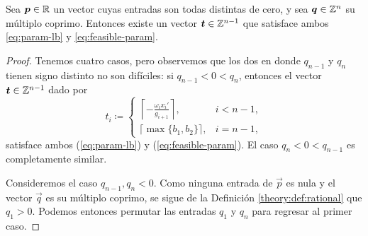 \begin{lemma}
	\label{lemma:t-existence}
	Sea $\boldsymbol{p} \in \mathbb{R}$ un vector cuyas entradas son todas distintas de cero, y sea $\boldsymbol{q} \in
	\mathbb{Z}^n$ su múltiplo coprimo. Entonces existe un vector $\boldsymbol{t} \in \mathbb{Z}^{n-1}$ que satisface ambos
	\eqref{eq:param-lb} y \eqref{eq:feasible-param}.
\end{lemma}
\begin{proof}
	Tenemos cuatro casos, pero observemos que los dos en donde $q_{n - 1}$ y $q_n$
	tienen signo distinto no son difíciles: si $q_{n - 1} <0 < q_n$, entonces el vector
	$\boldsymbol{t} \in \mathbb{Z}^{n-1}$ dado por
	\begin{equation*}
		t_i \coloneq \begin{cases}
			\left\lceil -\frac{\omega_ix_i'}{g_{i + 1}} \right\rceil, & i < n - 1, \\[0.5em]
			\lceil \max\lbrace b_1, b_2 \rbrace \rceil, & i = n - 1,
		\end{cases}
	\end{equation*}
	satisface ambos (\ref{eq:param-lb}) y (\ref{eq:feasible-param}). El caso $q_n < 0 <
	q_{n - 1}$ es completamente similar.

	Consideremos el caso $q_{n - 1}, q_n < 0$. Como ninguna entrada de $\vec{p}$ es nula y el vector
	$\vec{q}$ es su múltiplo coprimo, se sigue de la Definición \ref{theory:def:rational} que $q_1 >
	0$. Podemos entonces permutar las entradas $q_1$ y $q_{n}$ para regresar al primer caso.


\end{proof}
